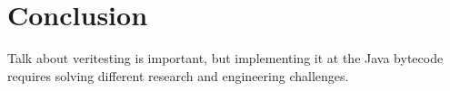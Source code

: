 \section{Conclusion}
Talk about veritesting is important, but implementing it at the Java bytecode requires solving different research and engineering challenges.